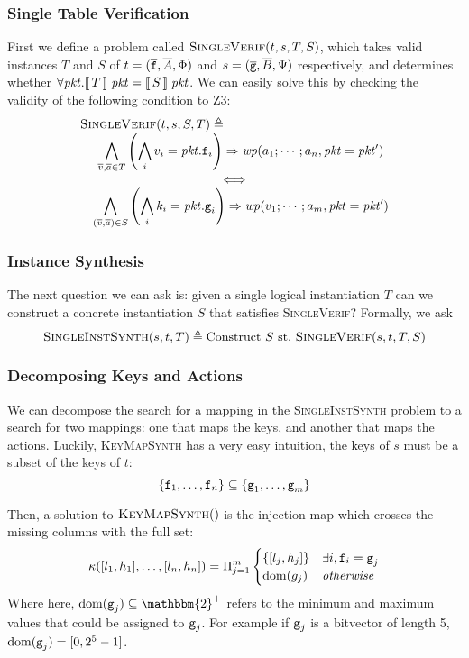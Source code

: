 \subsubsection{Single Table Verification}
First we define a problem called $\textsc{SingleVerif}(t,s,T, S)$,
which takes valid instances $T$ and $S$ of
$t = (\overline{\texttt{f}}, \overline{A}, \Phi)$ and
$s = (\overline{\texttt{g}}, \overline{B}, \Psi)$ respectively, and determines
whether $\forall \mathit{pkt}. \llbracket\,T\,\rrbracket\;\mathit{pkt} = \llbracket\,S\,\rrbracket\; \mathit{pkt}$. We can
easily solve this by checking the validity of the following condition
to Z3:
\[\begin{array}c
    \multicolumn{1}{l}{\textsc{SingleVerif}(t,s,S,T) \triangleq}\\
    \displaystyle \quad \bigwedge_{\vec v, \vec a \in T}
    \left(\bigwedge_i v_i = \pkt.\var f_i\right) \Rightarrow \wp(a_1;\cdots;a_n,\pkt = \pkt')\\ \iff \\
    \displaystyle \quad \bigwedge_{(\vec v, \vec a) \in S}\left(\bigwedge_i k_i = \pkt.\var g_i\right) \Rightarrow \wp(v_1;\cdots; a_m, \pkt= \pkt')
  \end{array}
\]

\subsubsection{Instance Synthesis}

The next question we can ask is: given a single logical instantiation
$T$ can we construct a concrete instantiation $S$ that satisfies
\textsc{SingleVerif}? Formally, we ask
\[\textsc{SingleInstSynth}(s,t,T) \triangleq \textrm{Construct}~S~\textrm{st.}~\textsc{SingleVerif}(s,t,T, S)\]

\subsubsection{Decomposing Keys and Actions}

We can decompose the search for a mapping in the
\textsc{SingleInstSynth} problem to a search for two mappings: one
that maps the keys, and another that maps the actions. Luckily,
\textsc{KeyMapSynth} has a very easy intuition, the keys of $s$ must
be a subset of the keys of $t$:
\[\{\texttt{f}_1, \ldots, \texttt{f}_n\} \subseteq \{\texttt{g}_1, \ldots, \texttt{g}_m\}\]

Then, a solution to $\textsc{KeyMapSynth}()$ is the injection map which crosses the missing columns with the full set:
\[\displaystyle \kappa ([l_1,h_1], \ldots, [l_n,h_n]) = \Pi_{j=1}^m \begin{cases}
    \{[l_j,h_j]\} &\exists i,  \texttt{f}_i = \texttt{g}_j \\
    \mathrm{dom}(g_j) &\mathit{otherwise}
  \end{cases}
\]
Where here, $\dom(\var g_j) \subseteq \mathbbm{2}^+$ refers to the
minimum and maximum values that could be assigned to $\texttt{g}_j$. For
example if $\texttt{g}_j$ is a bitvector of length 5,
$\mathrm{dom}(\texttt{g}_j) = [0,2^5-1]$.

